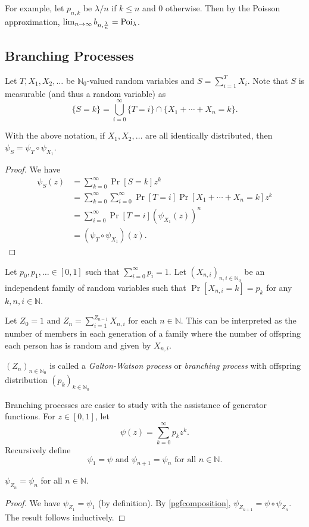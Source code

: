 For example, let $p_{n,k}$ be $\lambda/n$ if $k\leq n$ and $0$ otherwise. Then by the Poisson approximation, $\lim_{n\to\infty} b_{n,\frac{\lambda}{n}}=\operatorname{Poi}_{\lambda}$.

\subsection{Branching Processes}

Let $T,X_1,X_2,\ldots$ be $\mathbb{N}_0$-valued random variables and $S=\sum_{i=1}^T X_i$. Note that $S$ is measurable (and thus a random variable) as
$$\{S=k\}=\bigcup_{i=0}^\infty \{T=i\}\cap\{X_1+\cdots+X_n=k\}.$$

\begin{theorem}
\label{pgfcomposition}
    With the above notation, if $X_1,X_2,\ldots$ are all identically distributed, then $\psi_S=\psi_T\circ\psi_{X_1}$.
\end{theorem}
\begin{proof}
    We have
    \begin{align*}
        \psi_S(z) &= \sum_{k=0}^\infty\Pr[S=k]z^k \\
        &= \sum_{k=0}^\infty\sum_{i=0}^\infty \Pr[T=i]\Pr[X_1+\cdots+X_n=k]z^k \\
        &= \sum_{i=0}^\infty \Pr[T=i](\psi_{X_1}(z))^n \\
        &= (\psi_T\circ\psi_{X_1})(z).
    \end{align*}
\end{proof}

Let $p_0,p_1,\ldots\in[0,1]$ such that $\sum_{i=0}^\infty p_i = 1$. Let $(X_{n,i})_{n,i\in\mathbb{N}_0}$ be an independent family of random variables such that $\Pr[X_{n,i}=k]=p_k$ for any $k,n,i\in\mathbb{N}$.

\vspace{1mm}
Let $Z_0=1$ and $Z_n=\sum_{i=1}^{Z_{n-1}} X_{n,i}$ for each $n\in\mathbb{N}$. This can be interpreted as the number of members in each generation of a family where the number of offspring each person has is random and given by $X_{n,i}$.

\begin{definition}
    $(Z_n)_{n\in\mathbb{N}_0}$ is called a \textit{Galton-Watson process} or \textit{branching process} with offspring distribution $(p_k)_{k\in\mathbb{N}_0}$
\end{definition}

Branching processes are easier to study with the assistance of generator functions. For $z\in[0,1]$, let
$$\psi(z)=\sum_{k=0}^\infty p_k z^k.$$
Recursively define
$$\psi_1=\psi\text{ and }\psi_{n+1}=\psi_n\text{ for all }n\in\mathbb{N}.$$
\begin{theorem}
    $\psi_{Z_n}=\psi_n$ for all $n\in\mathbb{N}$.
\end{theorem}
\begin{proof}
    We have $\psi_{Z_1}=\psi_1$ (by definition). By \cref{pgfcomposition}, $\psi_{Z_{n+1}} = \psi\circ\psi_{Z_{n}}$. The result follows inductively.
\end{proof}

